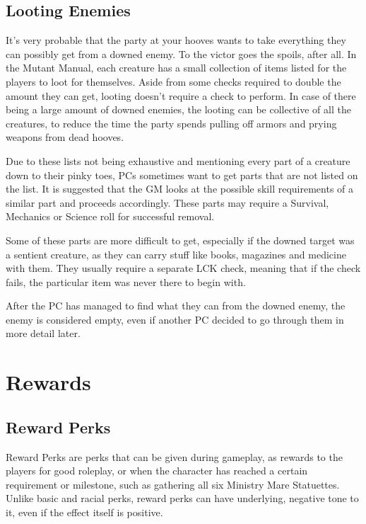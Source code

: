 \documentclass[11pt,a4paper,twocolumn]{book}
\begin{document}

    
    \subsection*{Looting Enemies}
    It's very probable that the party at your hooves wants to take everything they can possibly get from a downed enemy. To the victor goes the spoils, after all. In the Mutant Manual, each creature has a small collection of items listed for the players to loot for themselves. Aside from some checks required to double the amount they can get, looting doesn't require a check to perform. In case of there being a large amount of downed enemies, the looting can be collective of all the creatures, to reduce the time the party spends pulling off armors and prying weapons from dead hooves.
    
    Due to these lists not being exhaustive and mentioning every part of a creature down to their pinky toes, PCs sometimes want to get parts that are not listed on the list. It is suggested that the GM looks at the possible skill requirements of a similar part and proceeds accordingly. These parts may require a Survival, Mechanics or Science roll for successful removal.
    
    Some of these parts are more difficult to get, especially if the downed target was a sentient creature, as they can carry stuff like books, magazines and medicine with them. They usually require a separate LCK check, meaning that if the check fails, the particular item was never there to begin with.
    
    After the PC has managed to find what they can from the downed enemy, the enemy is considered empty, even if another PC decided to go through them in more detail later.
    
    \section*{Rewards}
    \subsection*{Reward Perks}
    Reward Perks are perks that can be given during gameplay, as rewards to the players for good roleplay, or when the character has reached a certain requirement or milestone, such as gathering all six Ministry Mare Statuettes. Unlike basic and racial perks, reward perks can have underlying, negative tone to it, even if the effect itself is positive.
    
\end{document}
